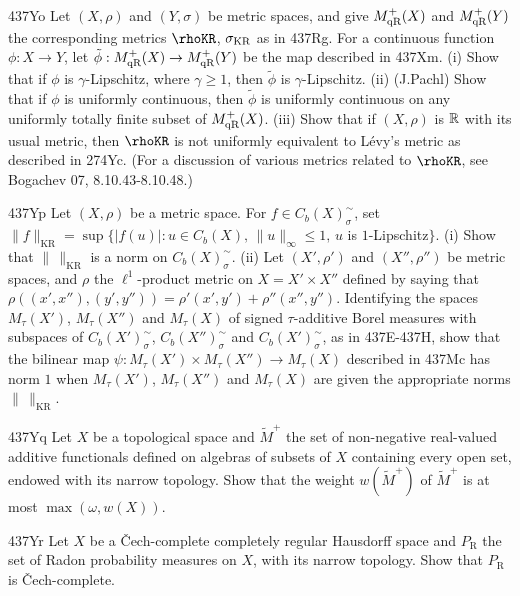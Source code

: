 {\spheader 437Yo
Let $(X,\rho)$ and $(Y,\sigma)$ be metric
spaces, and give $M^+_{\text{qR}}(X)$ and $M^+_{\text{qR}}(Y)$ the corresponding metrics
$\rhoKR$, $\sigma_{\text{KR}}$ as in 437Rg.   For a continuous function
$\phi:X\to Y$, let $\tilde\phi:M^+_{\text{qR}}(X)\to M^+_{\text{qR}}(Y)$ be the map
described in 437Xm.   (i) Show that if $\phi$ is $\gamma$-Lipschitz,
where $\gamma\ge 1$, then $\tilde\phi$ is $\gamma$-Lipschitz.   (ii)
(J.Pachl) Show
that if $\phi$ is uniformly continuous, then $\tilde\phi$ is uniformly
continuous on any uniformly totally finite subset of $M^+_{\text{qR}}(X)$.
(iii) Show that if $(X,\rho)$ is $\Bbb R$ with its usual
metric, then $\rhoKR$ is not uniformly equivalent to L\'evy's metric as
described in 274Yc.
(For a discussion of various metrics related to
$\rhoKR$, see {\smc Bogachev 07}, 8.10.43-8.10.48.)

\spheader 437Yp
Let $(X,\rho)$ be a metric space.   For $f\in C_b(X)^{\sim}_{\sigma}$, set
$\|f\|_{\text{KR}}
=\sup\{|f(u)|:u\in C_b(X),\,\|u\|_{\infty}\le 1,\,u$ is $1$-Lipschitz$\}$.
(i) Show that $\|\,\|_{\text{KR}}$ is a
norm on $C_b(X)^{\sim}_{\sigma}$.
(ii) Let $(X',\rho')$ and $(X'',\rho'')$ be metric spaces, and $\rho$ the
$\ell^1$-product metric on $X=X'\times X''$ defined by saying that
$\rho((x',x''),(y',y''))=\rho'(x',y')+\rho''(x'',y'')$.   Identifying the
spaces
$M_{\tau}(X')$, $M_{\tau}(X'')$ and $M_{\tau}(X)$ of signed $\tau$-additive
Borel measures with subspaces of
$C_b(X')^{\sim}_{\sigma}$, $C_b(X'')^{\sim}_{\sigma}$ and
$C_b(X')^{\sim}_{\sigma}$, as in 437E-437H, show that the bilinear map
$\psi:M_{\tau}(X')\times M_{\tau}(X'')\to M_{\tau}(X)$ described in
437Mc has norm $1$ when $M_{\tau}(X')$, $M_{\tau}(X'')$ and $M_{\tau}(X)$
are given the appropriate norms $\|\,\|_{\text{KR}}$.

\spheader 437Yq
Let $X$ be a topological space and $\tilde M^+$
the set of non-negative real-valued additive functionals defined on
algebras of subsets of $X$ containing every open set, endowed with its
narrow topology.   Show that the weight $w(\tilde M^+)$ of
$\tilde M^+$ is at most $\max(\omega,w(X))$.

\spheader 437Yr Let $X$ be a \v{C}ech-complete completely regular
Hausdorff space
and $P_{\text{R}}$ the set of Radon probability measures on $X$, with
its narrow topology.
Show that $P_{\text{R}}$ is \v{C}ech-complete.

}

